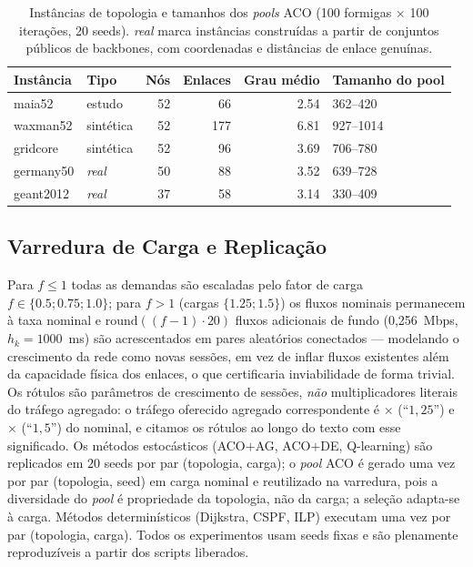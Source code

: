 \documentclass[journal]{IEEEtran}
\begin{document}
\begin{table}[!t]
\caption{Instâncias de topologia e tamanhos dos \emph{pools} ACO
(100 formigas $\times$ 100 iterações, 20 seeds). \emph{real} marca
instâncias construídas a partir de conjuntos públicos de backbones, com
coordenadas e distâncias de enlace genuínas.}
\label{tab:topo}
\centering
\begin{tabular}{@{}llrrrl@{}}
\toprule
Instância & Tipo & Nós & Enlaces & Grau médio & Tamanho do pool\\
\midrule
maia52 & estudo & 52 & 66 & 2.54 & 362--420\\
waxman52 & sintética & 52 & 177 & 6.81 & 927--1014\\
gridcore & sintética & 52 & 96 & 3.69 & 706--780\\
germany50 & \emph{real} & 50 & 88 & 3.52 & 639--728\\
geant2012 & \emph{real} & 37 & 58 & 3.14 & 330--409\\
\bottomrule
\end{tabular}
\end{table}

\subsection{Varredura de Carga e Replicação}
Para $f\le 1$ todas as demandas são escaladas pelo fator de carga
$f\in\{0.5; 0.75; 1.0\}$; para $f>1$ (cargas $\{1.25; 1.5\}$) os fluxos
nominais permanecem à taxa nominal e
$\mathrm{round}((f{-}1)\!\cdot\!20)$ fluxos adicionais de fundo
(0,256~Mbps, $h_k{=}1000$~ms) são acrescentados em pares aleatórios
conectados --- modelando o crescimento da rede como novas sessões, em vez de
inflar fluxos existentes além da capacidade física dos enlaces, o que
certificaria inviabilidade de forma trivial. Os rótulos são parâmetros de
crescimento de sessões, \emph{não} multiplicadores literais do tráfego
agregado: o tráfego oferecido agregado correspondente é
\LoadRatioHigh$\times$ (``$1{,}25$'') e \LoadRatioMax$\times$ (``$1{,}5$'')
do nominal, e citamos os rótulos ao longo do texto com esse significado.
Os métodos estocásticos
(ACO$+$AG, ACO$+$DE, Q-learning) são replicados em $20$ seeds por par
(topologia, carga); o \emph{pool} ACO é gerado uma vez por par (topologia,
seed) em carga nominal e reutilizado na varredura, pois a diversidade do
\emph{pool} é propriedade da topologia, não da carga; a seleção adapta-se à
carga. Métodos determinísticos (Dijkstra, CSPF, ILP) executam uma vez por
par (topologia, carga). Todos os experimentos usam seeds fixas e são
plenamente reproduzíveis a partir dos scripts liberados.
\end{document}
